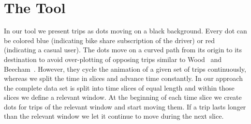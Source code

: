 \section{The Tool}
\label{sec:impl}
In our tool we present trips as dots moving on a black background.
Every dot can be colored blue (indicating bike share subscription of the driver)
or red (indicating a casual user). The dots move on a curved path from
its origin to its destination to avoid over-plotting of opposing trips
similar to Wood~\etal\cite{Wood2011} and
Beecham~\etal\cite{Beecham2012}.
However, they cycle the animation of a given set of trips continuously,
whereas we split the time in slices and advance time constantly.
In our approach the complete data set is split into time slices of equal
length and within those slices we define a relevant window.
At the beginning of each time slice we create dots for trips of the
relevant window and start moving them. If a trip lasts longer than the
relevant window we let it continue to move during the next slice.

